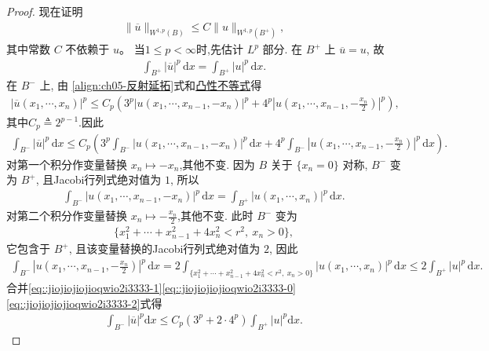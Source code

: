 \documentclass[../../main.tex]{subfiles}%
\begin{document}
\begin{proof}
现在证明
\begin{align*}
\|\overline{u}\|_{W^{1,p}(B)}\leqslant C\|u\|_{W^{1,p}(B^{+})},
\end{align*}
其中常数 $C$ 不依赖于 $u$。
当$1\leqslant p<\infty$时,先估计 \(L^p\) 部分. 在 \(B^+\) 上 \(\overline{u}=u\), 故
\begin{align*}
\int_{B^+}|\overline{u}|^p\,\mathrm{d}x=\int_{B^+}|u|^p\,\mathrm{d}x.
\end{align*}
在 \(B^-\) 上, 由 \eqref{align:ch05-反射延拓}式和\hyperref[Basis of Analytics-proposition:凸性不等式]{凸性不等式}得
\begin{align*}
|\overline{u}(x_1,\cdots,x_n)|^p
\leqslant C_p\left(3^p|u(x_1,\cdots,x_{n-1},-x_n)|^p
+4^p\left|u\left(x_1,\cdots,x_{n-1},-\frac{x_n}{2}\right)\right|^p\right),
\end{align*}
其中$C_p\triangleq 2^{p-1}$.因此
\begin{align}\label{eq::jiojiojiojioqwio2i3333-1}
\int_{B^-}|\overline{u}|^p\,\mathrm{d}x
\leqslant C_p\left(3^p\int_{B^-}|u(x_1,\cdots,x_{n-1},-x_n)|^p\,\mathrm{d}x
+4^p\int_{B^-}\left|u\left(x_1,\cdots,x_{n-1},-\frac{x_n}{2}\right)\right|^p\,\mathrm{d}x\right).
\end{align}
对第一个积分作变量替换 \(x_n\mapsto -x_n\),其他不变. 因为 \(B\) 关于 \(\{x_n=0\}\) 对称, \(B^-\) 变为 \(B^+\), 且Jacobi行列式绝对值为 \(1\), 所以
\begin{align}\label{eq::jiojiojiojioqwio2i3333-0}
\int_{B^-}|u(x_1,\cdots,x_{n-1},-x_n)|^p\,\mathrm{d}x
=\int_{B^+}|u(x_1,\cdots,x_n)|^p\,\mathrm{d}x.
\end{align}
对第二个积分作变量替换 \(x_n\mapsto -\frac{x_n}{2}\),其他不变. 此时 \(B^-\) 变为
\begin{align*}
\{x_1^2+\cdots+x_{n-1}^2+4x_n^2<r^2,\ x_n>0\},
\end{align*}
它包含于 \(B^+\), 且该变量替换的Jacobi行列式绝对值为 \(2\), 因此
\begin{align}\label{eq::jiojiojiojioqwio2i3333-2}
\int_{B^-}\left|u\left(x_1,\cdots,x_{n-1},-\frac{x_n}{2}\right)\right|^p\,\mathrm{d}x
=2\int_{\{x_1^2+\cdots+x_{n-1}^2+4x_n^2<r^2,\ x_n>0\}}|u(x_1,\cdots,x_n)|^p\,\mathrm{d}x
\leqslant 2\int_{B^+}|u|^p\,\mathrm{d}x.
\end{align}
合并\eqref{eq::jiojiojiojioqwio2i3333-1}\eqref{eq::jiojiojiojioqwio2i3333-0}\eqref{eq::jiojiojiojioqwio2i3333-2}式得
\begin{align*}
\int_{B^-}{\left| \overline{u} \right|^p\mathrm{d}x}\leqslant C_p\left( 3^p+2\cdot 4^p \right) \int_{B^+}{\left| u \right|^p\mathrm{d}x}.

\end{align*}
\end{proof}
\end{document}
